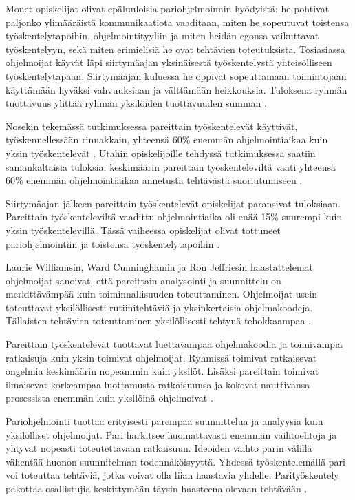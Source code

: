 \documentclass[finnish]{tktltiki2}
\theoremstyle{definition}
\theoremstyle{remark}
\begin{document}
Monet opiskelijat olivat epäluuloisia pariohjelmoinnin hyödyistä: he pohtivat paljonko ylimääräistä kommunikaatiota vaaditaan, miten he sopeutuvat toistensa työskentelytapoihin, ohjelmointityyliin ja miten heidän egonsa vaikuttavat työskentelyyn, sekä miten erimielisiä he ovat tehtävien toteutuksista. Tosiasiassa ohjelmoijat käyvät läpi siirtymäajan yksinäisestä työskentelystä yhteisölliseen työskentelytapaan. Siirtymäajan kuluessa he oppivat sopeuttamaan toimintojaan käyttämään hyväksi vahvuuksiaan ja välttämään heikkouksia. Tuloksena ryhmän tuottavuus ylittää ryhmän yksilöiden tuottavuuden summan \cite{WIL00}.

Nosekin tekemässä tutkimuksessa pareittain työskentelevät käyttivät, työskennellessään rinnakkain, yhteensä 60\% enemmän ohjelmointiaikaa kuin yksin työskentelevät \cite{NOS98}. Utahin opiskelijoille tehdyssä tutkimuksessa saatiin samankaltaisia tuloksia: keskimäärin pareittain työskenteleviltä vaati yhteensä 60\% enemmän ohjelmointiaikaa annetusta tehtävästä suoriutumiseen \cite{WIL00}.

Siirtymäajan jälkeen pareittain työskentelevät opiskelijat paransivat tuloksiaan. Pareittain työskenteleviltä vaadittu ohjelmointiaika oli enää 15\% suurempi kuin yksin työskentelevillä. Tässä vaiheessa opiskelijat olivat tottuneet pariohjelmointiin ja toistensa työskentelytapoihin \cite{WIL00}.

Laurie Williamsin, Ward Cunninghamin ja Ron Jeffriesin haastattelemat ohjelmoijat sanoivat, että pareittain analysointi ja suunnittelu on merkittävämpää kuin toiminnallisuuden toteuttaminen. Ohjelmoijat usein toteuttavat yksilöllisesti rutiinitehtäviä ja yksinkertaisia ohjelmakoodeja. Tällaisten tehtävien toteuttaminen yksilöllisesti tehtynä tehokkaampaa \cite{WIL00}.

Pareittain työskentelevät tuottavat luettavampaa ohjelmakoodia ja toimivampia ratkaisuja kuin yksin toimivat ohjelmoijat. Ryhmissä toimivat ratkaisevat ongelmia keskimäärin nopeammin kuin yksilöt. Lisäksi pareittain toimivat ilmaisevat korkeampaa luottamusta ratkaisuunsa ja kokevat nauttivansa prosessista enemmän kuin yksilöinä ohjelmoivat \cite{NOS98}.   

Pariohjelmointi tuottaa erityisesti parempaa suunnittelua ja analyysia kuin yksilölliset ohjelmoijat. Pari harkitsee huomattavasti enemmän vaihtoehtoja ja yhtyvät nopeasti toteutettavaan ratkaisuun. Ideoiden vaihto parin välillä vähentää huonon suunnitelman todennäköisyyttä. Yhdessä työskentelemällä pari voi toteuttaa tehtäviä, jotka voivat olla liian haastavia yhdelle. Parityöskentely pakottaa osallistujia keskittymään täysin haasteena olevaan tehtävään \cite{WIL00}.
\end{document}
